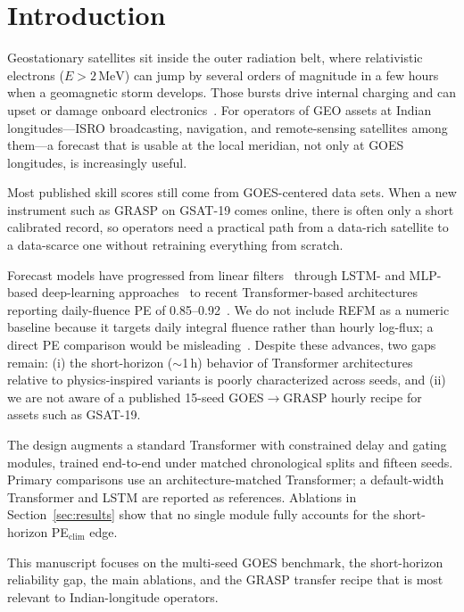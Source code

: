 \documentclass[conference]{IEEEtran}
\begin{document}
\section{Introduction}
Geostationary satellites sit inside the outer radiation belt, where
relativistic electrons (\(E>2\,\mathrm{MeV}\)) can jump by several orders of
magnitude in a few hours when a geomagnetic storm develops. Those bursts drive
internal charging and can upset or damage onboard electronics~\cite{b1,b2}.
For operators of GEO assets at Indian longitudes---ISRO broadcasting,
navigation, and remote-sensing satellites among them---a forecast that is
usable at the local meridian, not only at GOES longitudes, is increasingly
useful.

Most published skill scores still come from GOES-centered data sets. When a
new instrument such as GRASP on GSAT-19 comes online, there is often only a
short calibrated record, so operators need a practical path from a data-rich
satellite to a data-scarce one without retraining everything from scratch.

Forecast models have progressed from linear filters~\cite{b3,b4}
through LSTM- and MLP-based deep-learning approaches~\cite{b5,b6,b7}
to recent Transformer-based architectures reporting daily-fluence PE of
0.85--0.92~\cite{b8,b9,b10}. We do not include REFM as a numeric baseline because it targets daily integral
fluence rather than hourly log-flux; a direct PE comparison would be
misleading~\cite{b4}. Despite these advances,
two gaps remain: (i) the short-horizon (\(\sim\)1\,h) behavior of
Transformer architectures relative to physics-inspired variants is poorly
characterized across seeds, and (ii) we are not aware of a published 15-seed
GOES\(\rightarrow\)GRASP hourly recipe for assets such as GSAT-19.

The design augments a standard Transformer with constrained delay and
gating modules, trained end-to-end under matched chronological splits
and fifteen seeds. Primary comparisons use an architecture-matched
Transformer; a default-width Transformer and LSTM are reported as
references. Ablations in Section~\ref{sec:results} show that no single
module fully accounts for the short-horizon PE$_{\mathrm{clim}}$ edge.

This manuscript focuses on the multi-seed GOES benchmark, the
short-horizon reliability gap, the main ablations, and the GRASP transfer
recipe that is most relevant to Indian-longitude operators.
\end{document}
